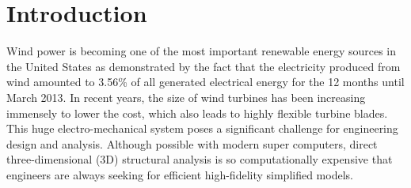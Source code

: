 \section{Introduction} 

Wind power is becoming one of the most important renewable energy sources in
the United States as demonstrated by the fact that the electricity produced
from wind amounted to 3.56\% of all generated electrical energy for the 12
months until March 2013\cite{WindWiki}. In recent years, the size of wind
turbines has been increasing immensely to lower the cost, which also leads
to highly flexible turbine blades. This huge electro-mechanical system poses
a significant challenge for engineering design and analysis. Although
possible with modern super computers, direct three-dimensional (3D)
structural analysis is so computationally expensive that engineers are
always seeking for efficient high-fidelity simplified models.

